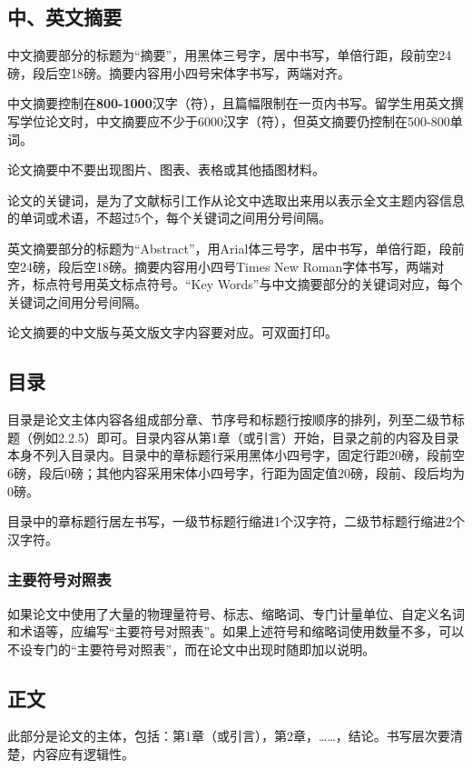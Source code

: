 \subsection{中、英文摘要}

中文摘要部分的标题为“摘要”，用黑体三号字，居中书写，单倍行距，段前空24磅，段后空18磅。摘要内容用小四号宋体字书写，两端对齐。

中文摘要控制在\textbf{800-1000}汉字（符），且篇幅限制在一页内书写。留学生用英文撰写学位论文时，中文摘要应不少于6000汉字（符），但英文摘要仍控制在500-800单词。

论文摘要中不要出现图片、图表、表格或其他插图材料。

论文的关键词，是为了文献标引工作从论文中选取出来用以表示全文主题内容信息的单词或术语，不超过5个，每个关键词之间用分号间隔。

英文摘要部分的标题为“Abstract”，用Arial体三号字，居中书写，单倍行距，段前空24磅，段后空18磅。摘要内容用小四号Times New Roman字体书写，两端对齐，标点符号用英文标点符号。“Key Words”与中文摘要部分的关键词对应，每个关键词之间用分号间隔。

论文摘要的中文版与英文版文字内容要对应。可双面打印。

\subsection{目录}

目录是论文主体内容各组成部分章、节序号和标题行按顺序的排列，列至二级节标题（例如2.2.5）即可。目录内容从第1章（或引言）开始，目录之前的内容及目录本身不列入目录内。目录中的章标题行采用黑体小四号字，固定行距20磅，段前空6磅，段后0磅；其他内容采用宋体小四号字，行距为固定值20磅，段前、段后均为0磅。

目录中的章标题行居左书写，一级节标题行缩进1个汉字符，二级节标题行缩进2个汉字符。

\subsubsection{主要符号对照表}

如果论文中使用了大量的物理量符号、标志、缩略词、专门计量单位、自定义名词和术语等，应编写“主要符号对照表”。如果上述符号和缩略词使用数量不多，可以不设专门的“主要符号对照表”，而在论文中出现时随即加以说明。 

\subsection{正文}

此部分是论文的主体，包括：第1章（或引言），第2章，……，结论。书写层次要清楚，内容应有逻辑性。

